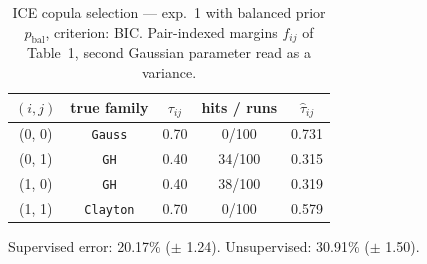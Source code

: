 \begin{table}[htbp]
  \centering
  \caption{ICE copula selection — exp.\ 1 with balanced prior $p_{\text{bal}}$, criterion: BIC. Pair-indexed margins $f_{ij}$ of Table~1, second Gaussian parameter read as a variance.}
  \label{tab:exp3-exp1_bal_p__bic}
  \begin{tabular}{ccccc}
    \toprule
    $(i, j)$ & true family & $\tau_{ij}$ & hits / runs & $\hat\tau_{ij}$ \\
    \midrule
    (0, 0) & \texttt{Gauss} & 0.70 & 0/100 & 0.731 \\
    (0, 1) & \texttt{GH} & 0.40 & 34/100 & 0.315 \\
    (1, 0) & \texttt{GH} & 0.40 & 38/100 & 0.319 \\
    (1, 1) & \texttt{Clayton} & 0.70 & 0/100 & 0.579 \\
    \bottomrule
  \end{tabular}
  \par\smallskip Supervised error: 20.17\% ($\pm$ 1.24). Unsupervised: 30.91\% ($\pm$ 1.50).
\end{table}
